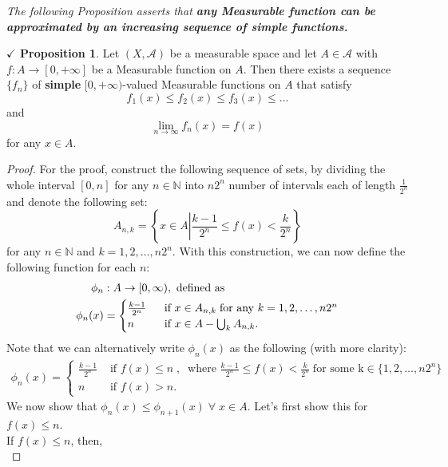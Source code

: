 \documentclass{article}
\theoremstyle{definition}
\theoremstyle{remark}
\theoremstyle{definition}
\theoremstyle{definition}
\newtheorem{proposition}{$\checkmark$ Proposition}
\theoremstyle{definition}
\newcommand{\bunion}{\bigcup}
\newcommand{\N}{\mathbb{N}}
\newcommand{\alg}[1]{\mathscr{#1}}
\begin{document}
\emph{The following Proposition asserts that \textbf{any Measurable function can be approximated by an increasing sequence of simple functions.}}
\begin{proposition}\label{P-27}
	Let $ (X,\alg{A}) $ be a measurable space and let $ A \in \alg{A} $ with $ f :A\to[0,+\infty] $ be a Measurable function on $ A $. Then there exists a sequence $ \{f_n\} $ of \textbf{simple} $ [0,+\infty) $-valued Measurable functions on $ A $ that satisfy 
	\[f_1(x)\le f_2(x)\le f_3(x)\le \dots\]
	and 
	\[\lim_{n\to\infty } f_{n}(x) = f(x)\]
	for any $ x\in A $.
\end{proposition}
\begin{proof}
	For the proof, construct the following sequence of sets, by dividing the whole interval $ [0,n] $ for any $ n \in \N$ into $ n2^n $ number of intervals each of length $ \frac{1}{2^n} $ and denote the following set:
	\[A_{n,k} = \left \{x\in A\left\vert\frac{k-1}{2^n}\le f(x)<\frac{k}{2^n}\right.\right \}\]
	for any $ n\in \N $ and $ k = 1,2,\dots,n2^n $. With this construction, we can now define the following function for each $ n $:
	\begin{equation*}
		\begin{split}
			\phi_n &: A \to [0,\infty), \text{ defined as}\\
			\phi_n(x)&= \begin{cases}
				\frac{k-1}{2^n}\;&\text{ if }x\in A_{n,k}\;\text{for any $ k=1,2,\dots,n2^n $}\\
				n\;&\text{ if } x\in A- \bunion_k A_{n,k}.
			\end{cases} 
		\end{split}
	\end{equation*}
	Note that we can alternatively write $ \phi_n(x) $ as the following (with more clarity):
	\begin{equation*}
		\begin{split}
			\phi_n(x) = \begin{cases}
				\frac{k-1}{2^n} &\text{ if }f(x)\le n\;,\;\;\text{where } \frac{k-1}{2^n} \le f(x) < \frac{k}{2^n} \;\text{for some k} \in  \{1,2,\dots,n2^n\} \\
				n &\text{ if }f(x)>n.
			\end{cases}
		\end{split}
	\end{equation*}
	We now show that $ \phi_n(x)\le \phi_{n+1}(x) \;\forall\;x\in A$. Let's first show this for $ f(x) \le n $. \\
	If $ f(x)\le n $, then,
	\begin{equation*}

\end{equation*}
\end{proof}
\end{document}
